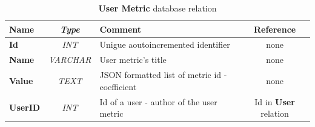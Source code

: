 		\begin{table}[t]
			\centering
			\begin{tabularx}{\textwidth}{@{} >{\bf}Y >{\em}c l c @{}} %
				\toprule
				Name	& Type			& Comment											& Reference						\\
				\midrule
				
				Id		& INT			& Unigue aoutoincremented identifier				& none							\\
				Name	& VARCHAR		& User metric's title								& none							\\
				Value	& TEXT			& JSON formatted list of metric id - coefficient	& none							\\
				UserID	& INT			& Id of a user - author of the user metric			& Id in \textbf{User} relation	\\
				
				\bottomrule
			\end{tabularx}
			\caption{\textbf{User Metric} database relation}
			\label{umetrictable}
		\end{table}
